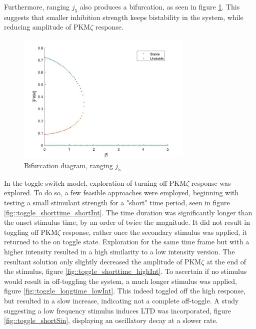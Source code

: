 \documentclass[12pt, a4paper]{article}
\newcommand{\PK}{PKM$\zeta$ }
\begin{document}
Furthermore, ranging $j_5$ also produces a bifurcation, as seen in figure \ref{fig::j5Range}. This suggests that smaller inhibition strength keeps bistability in the system, while reducing amplitude of \PK response.  
\begin{figure}[H]
    \centering
    \includegraphics[width = 0.75\textwidth]{pics/inhibition_j5Range.jpg}
    \caption{Bifurcation diagram, ranging $j_5$}
    \label{fig::j5Range}
\end{figure}

In the toggle switch model, exploration of turning off \PK response was explored. To do so, a few feasible approaches were employed, beginning with testing a small stimulant strength for a "short" time period, seen in figure \ref{fig::toggle_shorttime_shortInt}. The time duration was significantly longer than the onset stimulus time, by an order of twice the magnitude. It did not result in toggling off \PK response, rather once the secondary stimulus was applied, it returned to the on toggle state. Exploration for the same time frame but with a higher intensity resulted in a high similarity to a low intensity version. The resultant solution only slightly decreased the amplitude of \PK at the end of the stimulus, figure \ref{fig::toggle_shorttime_highInt}. To ascertain if no stimulus would result in off-toggling the system, a much longer stimulus was applied, figure \ref{fig::toggle_longtime_lowInt}. This indeed toggled off the high response, but resulted in a slow increase, indicating not a complete off-toggle. A study suggesting a low frequency stimulus induces LTD was incorporated, figure \ref{fig::toggle_shortSin}, displaying an oscillatory decay at a slower rate. 
\end{document}
